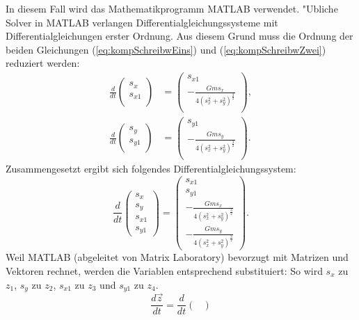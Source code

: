 \begin{refsection}
In diesem Fall wird das Mathematikprogramm MATLAB verwendet. 
%
"Ubliche Solver in MATLAB verlangen Differentialgleichungssysteme mit Differentialgleichungen erster Ordnung.
Aus diesem Grund muss die Ordnung der beiden Gleichungen (\ref{eq:kompSchreibwEins}) und (\ref{eq:kompSchreibwZwei}) reduziert werden:
\begin{align*}
\frac{d}{dt} \begin{pmatrix}
s_x \\ 
s_{x1}\\
\end{pmatrix} &= \begin{pmatrix}
s_{x1} \\[1mm]
\displaystyle-\frac{G m s_x}{4(s_x^2 + s_y^2)^\frac32} \\
\end{pmatrix},
\\
\frac{d}{dt} \begin{pmatrix}
s_y \\ 
s_{y1}\\
\end{pmatrix} &= \begin{pmatrix}
s_{y1} \\[1mm]
\displaystyle-\frac{G m s_y}{4(s_x^2 + s_y^2)^\frac32} \\
\end{pmatrix}.
\end{align*}
Zusammengesetzt ergibt sich folgendes Differentialgleichungssystem:
\begin{equation}
\frac{d}{dt} \begin{pmatrix}
s_x \\ 
s_y \\
s_{x1}\\
s_{y1}
\end{pmatrix} =
\begin{pmatrix}
s_{x1} \\ 
s_{y1}\\[1mm]
\displaystyle-\frac{G m s_x}{4(s_x^2 + s_y^2)^\frac32} \\[4mm]
\displaystyle-\frac{G m s_y}{4(s_x^2 + s_y^2)^\frac32}
\end{pmatrix}.
\end{equation}
Weil MATLAB (abgeleitet von Matrix Laboratory) bevorzugt mit Matrizen und Vektoren rechnet, werden die Variablen entsprechend substituiert:
So wird $s_x$ zu $z_1$, $s_y$ zu $z_2$, $s_{x1}$ zu $z_3$ und $s_{y1}$ zu $z_4$.
\begin{equation}\label{eq:zustandsraumdarst}
\frac{d \vec{z}}{dt}=\frac{d}{dt} \begin{pmatrix}

\end{pmatrix}
\end{equation}
\end{refsection}
